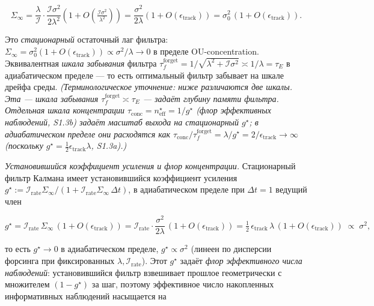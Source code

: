 \documentclass[12pt]{iopart}
\begin{document}
\begin{equation}\Sigma_\infty = \frac{\lambda}{\mathcal I}\cdot\frac{\mathcal I\sigma^2}{2\lambda^2}\left(1 + O\!\left(\tfrac{\mathcal I\sigma^2}{\lambda^2}\right)\right) = \frac{\sigma^2}{2\lambda}\left(1 + O(\epsilon_{\text{track}})\right) = \sigma_0^2\,(1 + O(\epsilon_{\text{track}})). \tag{S1.3}\end{equation}



Это \emph{стационарный} остаточный лаг фильтра: \(\Sigma_\infty = \sigma_0^2(1+O(\epsilon_{\text{track}})) \propto \sigma^2/\lambda \to 0\) в пределе OU-concentration. Эквивалентная \emph{шкала забывания} фильтра \(\tau_f^{\text{forget}} = 1/\sqrt{\lambda^2 + \mathcal I\sigma^2} \asymp 1/\lambda = \tau_E\) в адиабатическом пределе --- то есть оптимальный фильтр забывает на шкале дрейфа среды. \emph{(Терминологическое уточнение: ниже различаются две шкалы. Эта --- шкала забывания \(\tau_f^{\text{forget}} \asymp \tau_E\) --- задаёт глубину памяти фильтра. Отдельная шкала концентрации \(\tau_{\text{conc}} = n_{\text{eff}}^\star = 1/g^\star\) (флор эффективных наблюдений, S1.3b) задаёт масштаб выхода на стационарный \(g^\star\); в адиабатическом пределе они расходятся как \(\tau_{\text{conc}}/\tau_f^{\text{forget}} = \lambda/g^\star = 2/\epsilon_{\text{track}} \to \infty\) (поскольку \(g^\star = \tfrac12\epsilon_{\text{track}}\lambda\), S1.3a).)}



\emph{Установившийся коэффициент усиления и флор концентрации.} Стационарный фильтр Калмана имеет установившийся коэффициент усиления \(g^\star := \mathcal I_{\text{rate}}\Sigma_\infty/(1 + \mathcal I_{\text{rate}}\Sigma_\infty\,\Delta t)\), в адиабатическом пределе при \(\Delta t = 1\) ведущий член



\begin{equation}g^\star = \mathcal I_{\text{rate}}\,\Sigma_\infty\,(1+O(\epsilon_{\text{track}})) = \mathcal I_{\text{rate}}\cdot\frac{\sigma^2}{2\lambda}\,(1+O(\epsilon_{\text{track}})) = \tfrac12\,\epsilon_{\text{track}}\,\lambda\,(1+O(\epsilon_{\text{track}})) \;\propto\; \sigma^2, \tag{S1.3a}\end{equation}



то есть \(g^\star \to 0\) в адиабатическом пределе, \(g^\star \propto \sigma^2\) (линеен по дисперсии форсинга при фиксированных \(\lambda, \mathcal I_{\text{rate}}\)). Этот \(g^\star\) задаёт \emph{флор эффективного числа наблюдений}: установившийся фильтр взвешивает прошлое геометрически с множителем \((1-g^\star)\) за шаг, поэтому эффективное число накопленных информативных наблюдений насыщается на
\end{document}
